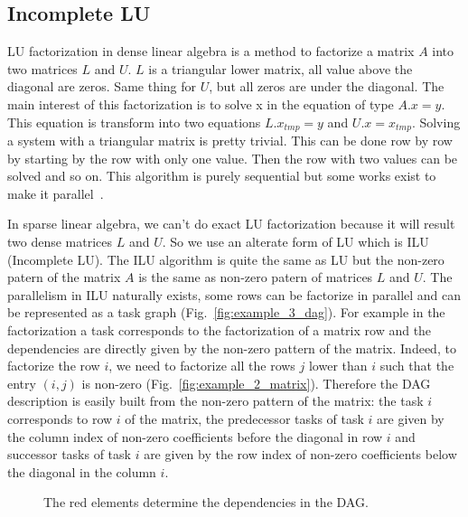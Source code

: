 \subsection{Incomplete LU}
LU factorization in dense linear algebra is a method to factorize a matrix $A$ into two matrices $L$ and $U$.
%
$L$ is a triangular lower matrix, all value above the diagonal are zeros.
%
Same thing for $U$, but all zeros are under the diagonal.
%
The main interest of this factorization is to solve x in the equation of type $A.x=y$.
%
This equation is transform into two equations $L.x_{tmp}=y$ and $U.x=x_{tmp}$.
%
Solving a system with a triangular matrix is pretty trivial.
%
This can be done row by row by starting by the row with only one value.
%
Then the row with two values can be solved and so on.
%
This algorithm is purely sequential but some works exist to make it parallel~\cite{plama_lu}.



In sparse linear algebra, we can't do exact LU factorization because it will result two dense matrices $L$ and $U$.
%
So we use an alterate form of LU which is ILU (Incomplete LU).
%
The ILU algorithm is quite the same as LU but the non-zero patern of the matrix $A$ is the same as non-zero patern of matrices $L$ and $U$.
%
The parallelism in ILU naturally exists, some rows can be factorize in parallel and can be represented as a task graph (Fig.~\ref{fig:example_3_dag}).
%
For example in the factorization a task corresponds to the factorization of a matrix row and the dependencies are directly given by the non-zero pattern of the matrix.
%
Indeed, to factorize the row $i$, we need to factorize all the rows $j$ lower than $i$ such that the entry $(i,j)$ is non-zero (Fig.~\ref{fig:example_2_matrix}).
%
Therefore the DAG description is easily built from the non-zero pattern of the matrix:
%
the task $i$ corresponds to row $i$ of the matrix, the predecessor tasks of task $i$ are given by the column index of non-zero coefficients before the diagonal in row $i$ and successor tasks of task $i$ are given by the row index of non-zero coefficients below the diagonal in the column $i$.

\begin{figure}[!ht]
     \begin{center}
    \end{center}
    \caption{The red elements determine the dependencies in the DAG.}
    \label{fig:exemple_3_dag}
\end{figure}

